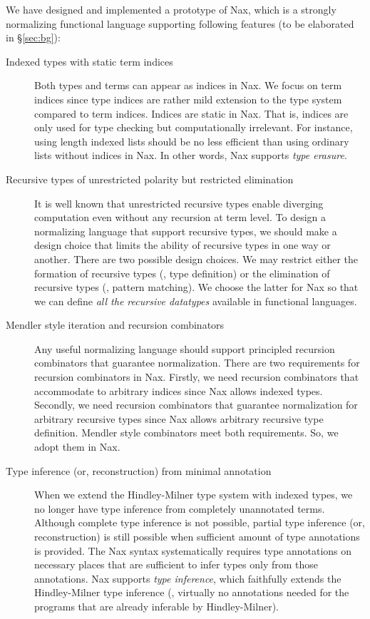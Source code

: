 We have designed and implemented a prototype of Nax, which is
a strongly normalizing functional language supporting following features
(to be elaborated in \S\ref{sec:bg}):
\begin{description}
\item[Indexed types with static term indices]
Both types and terms can appear as indices in Nax.
We focus on term indices since type indices are rather mild extension to
the type system compared to term indices.
Indices are static in Nax. That is, indices are only used for type checking
but computationally irrelevant. For instance, using length indexed lists
should be no less efficient than using ordinary lists without indices in Nax.
In other words, Nax supports \emph{type erasure}.

\item[Recursive types of unrestricted polarity but restricted elimination]
It is well known that unrestricted recursive types enable diverging computation
even without any recursion at term level. To design a normalizing language
that support recursive types, we should make a design choice that limits
the ability of recursive types in one way or another. There are two possible
design choices. We may restrict either the formation of recursive types
(\ie, type definition) or the elimination of recursive types
(\ie, pattern matching). We choose the latter for Nax so that we can
define \emph{all the recursive datatypes} available in functional languages.

\item[Mendler style iteration and recursion combinators]
Any useful normalizing language should support principled recursion
combinators that guarantee normalization. There are two requirements
for recursion combinators in Nax. Firstly, we need recursion combinators
that accommodate to arbitrary indices since Nax allows indexed types.
Secondly, we need recursion combinators that guarantee normalization for
arbitrary recursive types since Nax allows arbitrary recursive type definition.
Mendler style combinators meet both requirements. So, we adopt them in Nax.

\item[Type inference (or, reconstruction) from minimal annotation]
When we extend the Hindley-Milner type system with indexed types, we no longer
have type inference from completely unannotated terms. Although complete
type inference is not possible, partial type inference (or, reconstruction) is
still possible when sufficient amount of type annotations is provided.
The Nax syntax systematically requires type annotations on necessary places
that are sufficient to infer types only from those annotations.
Nax supports \emph{type inference}, which faithfully extends the Hindley-Milner
type inference (\ie, virtually no annotations needed for the programs that are
already inferable by Hindley-Milner).
\end{description}




